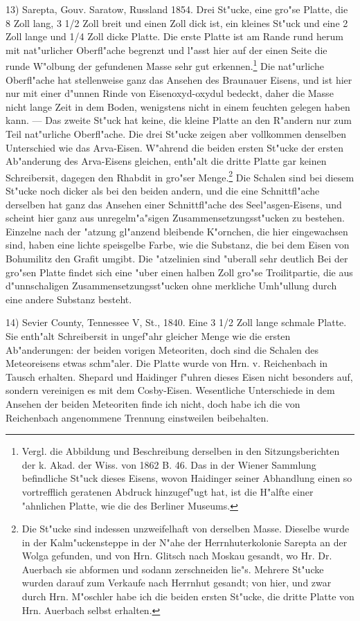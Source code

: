 \documentclass[a4paper, 11pt, oneside, german]{article}
\begin{document}
13) Sarepta, Gouv. Saratow, Russland 1854. Drei St"ucke, eine gro"se Platte, die 8 Zoll lang, 3 1/2 Zoll breit und einen Zoll dick ist, ein kleines St"uck und eine 2 Zoll lange und 1/4 Zoll dicke Platte. Die erste Platte ist am Rande rund herum mit nat"urlicher Oberfl"ache begrenzt und l"asst hier auf der einen Seite die runde W"olbung der gefundenen Masse sehr gut erkennen.\footnote{Vergl. die Abbildung und Beschreibung derselben in den Sitzungsberichten der k. Akad. der Wiss. von 1862 B. 46. Das in der Wiener Sammlung befindliche St"uck dieses Eisens, wovon Haidinger seiner Abhandlung einen so vortrefflich geratenen Abdruck hinzugef"ugt hat, ist die H"alfte einer "ahnlichen Platte, wie die des Berliner Museums.} Die nat"urliche Oberfl"ache hat stellenweise ganz das Ansehen des Braunauer Eisens, und ist hier nur mit einer d"unnen Rinde von Eisenoxyd-oxydul bedeckt, daher die Masse nicht lange Zeit in dem Boden, wenigstens nicht in einem feuchten gelegen haben kann. --- Das zweite St"uck hat keine, die kleine Platte an den R"andern nur zum Teil nat"urliche Oberfl"ache. Die drei St"ucke zeigen aber vollkommen denselben Unterschied wie das Arva-Eisen. W"ahrend die beiden ersten St"ucke der ersten Ab"anderung des Arva-Eisens gleichen, enth"alt die dritte Platte gar keinen Schreibersit, dagegen den Rhabdit in gro"ser Menge.\footnote{Die St"ucke sind indessen unzweifelhaft von derselben Masse. Dieselbe wurde in der Kalm"uckensteppe in der N"ahe der Herrnhuterkolonie Sarepta an der Wolga gefunden, und von Hrn. Glitsch nach Moskau gesandt, wo Hr. Dr. Auerbach sie abformen und sodann zerschneiden lie"s. Mehrere St"ucke wurden darauf zum Verkaufe nach Herrnhut gesandt; von hier, und zwar durch Hrn. M"oschler habe ich die beiden ersten St"ucke, die dritte Platte von Hrn. Auerbach selbst erhalten.} Die Schalen sind bei diesem St"ucke noch dicker als bei den beiden andern, und die eine Schnittfl"ache derselben hat ganz das Ansehen einer Schnittfl"ache des Seel"asgen-Eisens, und scheint hier ganz aus unregelm"a"sigen Zusammensetzungsst"ucken zu bestehen. Einzelne nach der "atzung gl"anzend bleibende K"ornchen, die hier eingewachsen sind, haben eine lichte speisgelbe Farbe, wie die Substanz, die bei dem Eisen von Bohumilitz den Grafit umgibt. Die "atzelinien sind "uberall sehr deutlich Bei der gro"sen Platte findet sich eine "uber einen halben Zoll gro"se Troilitpartie, die aus d"unnschaligen Zusammensetzungsst"ucken ohne merkliche Umh"ullung durch eine andere Substanz besteht.

14) Sevier County, Tennessee V, St., 1840. Eine 3 1/2 Zoll lange schmale Platte. Sie enth"alt Schreibersit in ungef"ahr gleicher Menge wie die ersten Ab"anderungen: der beiden vorigen Meteoriten, doch sind die Schalen des Meteoreisens etwas schm"aler. Die Platte wurde von Hrn. v. Reichenbach in Tausch erhalten. Shepard und Haidinger f"uhren dieses Eisen nicht besonders auf, sondern vereinigen es mit dem Cosby-Eisen. Wesentliche Unterschiede in dem Ansehen der beiden Meteoriten finde ich nicht, doch habe ich die von Reichenbach angenommene Trennung einstweilen beibehalten.
\end{document}
